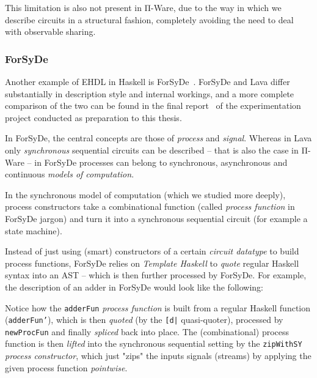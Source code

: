             \begin{center}
            \end{center}

            This limitation is also not present in Π-Ware, due to the way in which we describe circuits
            in a structural fashion, completely avoiding the need to deal with observable sharing.


            \subsubsection{ForSyDe}
            Another example of \ac{EHDL} in Haskell is ForSyDe~\cite{forsyde1999}.
            ForSyDe and Lava differ substantially in description style and internal workings,
            and a more complete comparison of the two can be found
            in the final report~\cite{functional-hardware-survey}
            of the experimentation project conducted as preparation to this thesis.

            In ForSyDe, the central concepts are those of \emph{process} and \emph{signal}.
            Whereas in Lava only \emph{synchronous} sequential circuits can be described – that is
            also the case in Π-Ware – in ForSyDe processes can belong to synchronous,
            asynchronous and continuous \emph{models of computation}.

            In the synchronous model of computation (which we studied more deeply),
            process constructors take a combinational function (called \emph{process function} in
            ForSyDe jargon) and turn it into a synchronous sequential circuit
            (for example a state machine).

            Instead of just using (smart) constructors of a certain \emph{circuit datatype} to build
            process functions, ForSyDe relies on \emph{Template Haskell} to
            \emph{quote} regular Haskell syntax into an \ac{AST} – which is then further processed by ForSyDe.
            For example, the description of an adder in ForSyDe would look like the following:

            \begin{center}
            \end{center}

            Notice how the \texttt{adderFun} \emph{process function} is built from a regular Haskell function
            (\texttt{adderFun'}), which is then \emph{quoted} (by the \texttt{[d|} quasi-quoter),
            processed by \texttt{newProcFun} and finally \emph{spliced} back into place.
            The (combinational) process function is then \emph{lifted} into the synchronous sequential setting
            by the \texttt{zipWithSY} \emph{process constructor},
            which just "zips" the inputs signals (streams) by applying the given process function \emph{pointwise}.

